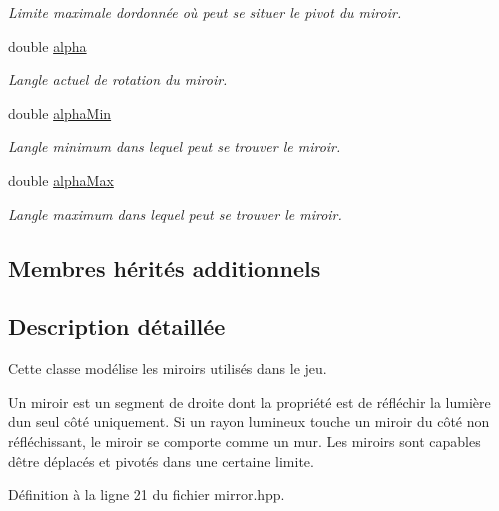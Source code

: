 \begin{DoxyCompactItemize}
\begin{DoxyCompactList}\small\item\em Limite maximale d\textquotesingle{}ordonnée où peut se situer le pivot du miroir. \end{DoxyCompactList}\item 
double \hyperlink{classMirror_a28ecd988b42db315b57fc8d9b23ebd86}{alpha}
\begin{DoxyCompactList}\small\item\em L\textquotesingle{}angle actuel de rotation du miroir. \end{DoxyCompactList}\item 
double \hyperlink{classMirror_ac42fb9a193abfb984ca27bbad2564ff9}{alpha\+Min}
\begin{DoxyCompactList}\small\item\em L\textquotesingle{}angle minimum dans lequel peut se trouver le miroir. \end{DoxyCompactList}\item 
double \hyperlink{classMirror_acc41ebc589e76d723bff02eea9ddfee3}{alpha\+Max}
\begin{DoxyCompactList}\small\item\em L\textquotesingle{}angle maximum dans lequel peut se trouver le miroir. \end{DoxyCompactList}\end{DoxyCompactItemize}
\subsection*{Membres hérités additionnels}


\subsection{Description détaillée}
Cette classe modélise les miroirs utilisés dans le jeu. 

Un miroir est un segment de droite dont la propriété est de réfléchir la lumière d\textquotesingle{}un seul côté uniquement. Si un rayon lumineux touche un miroir du côté non réfléchissant, le miroir se comporte comme un mur. Les miroirs sont capables d\textquotesingle{}être déplacés et pivotés dans une certaine limite. 

Définition à la ligne 21 du fichier mirror.\+hpp.



